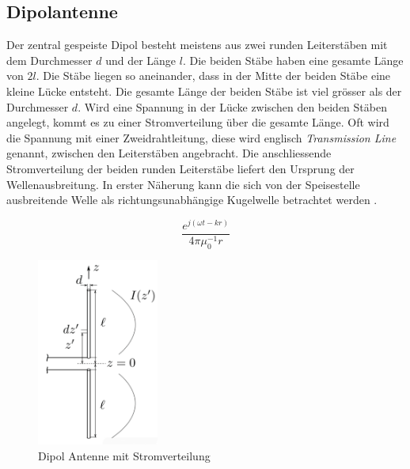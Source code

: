 \newpage
\subsection{Dipolantenne}\label{sec:DipolAntenne}
Der zentral gespeiste Dipol besteht meistens aus zwei runden Leiterstäben mit dem Durchmesser $d$ und der Länge $l$. Die beiden Stäbe haben eine gesamte Länge von $2l$. Die  Stäbe liegen so aneinander, dass in der Mitte der beiden Stäbe eine kleine Lücke entsteht. Die gesamte Länge der beiden Stäbe ist viel grösser als  der Durchmesser $d$. Wird eine Spannung  in der Lücke zwischen den beiden Stäben angelegt, kommt es zu einer Stromverteilung über die gesamte Länge. Oft wird die Spannung mit einer Zweidrahtleitung,  diese wird englisch \textit{Transmission Line} genannt, zwischen den Leiterstäben angebracht. Die anschliessende Stromverteilung der beiden runden Leiterstäbe liefert den Ursprung der Wellenausbreitung. In erster Näherung kann die sich von der Speisestelle ausbreitende Welle als richtungsunabhängige Kugelwelle betrachtet werden \cite{elliott1981antenna}.

\begin{equation}\label{term:Kugelwelle}
\frac{e^{j(\omega t-kr)}}{4\pi \mu_{0}^{-1}r}
\end{equation}

\begin{figure}[!ht]
	\centering
	\includegraphics[width=4cm]{content/bilder/Dipol_EMANT_S42.pdf}%
	\caption{Dipol Antenne mit Stromverteilung \cite{Tekom}}
	\label{FitzDipol}
\end{figure}


